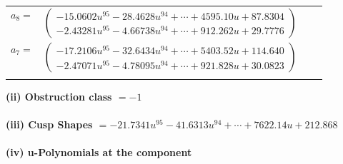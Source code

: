 \documentclass[1p]{elsarticle_modified}
\theoremstyle{definition}
\begin{document}
\begin{tabular}{m{7pt} m{180pt} m{7pt} m{180pt} }
\flushright $a_{8}=$&$\begin{pmatrix}-15.0602 u^{95}-28.4628 u^{94}+\cdots+4595.10 u+87.8304\\-2.43281 u^{95}-4.66738 u^{94}+\cdots+912.262 u+29.7776\end{pmatrix}$ \\
\flushright $a_{7}=$&$\begin{pmatrix}-17.2106 u^{95}-32.6434 u^{94}+\cdots+5403.52 u+114.640\\-2.47071 u^{95}-4.78095 u^{94}+\cdots+921.828 u+30.0823\end{pmatrix}$\\&\end{tabular}
\flushleft \textbf{(ii) Obstruction class $= -1$}\\~\\
\flushleft \textbf{(iii) Cusp Shapes $= -21.7341 u^{95}-41.6313 u^{94}+\cdots+7622.14 u+212.868$}\\~\\
\newpage\renewcommand{\arraystretch}{1}
\flushleft \textbf{(iv) u-Polynomials at the component}\newline \\
\end{document}
